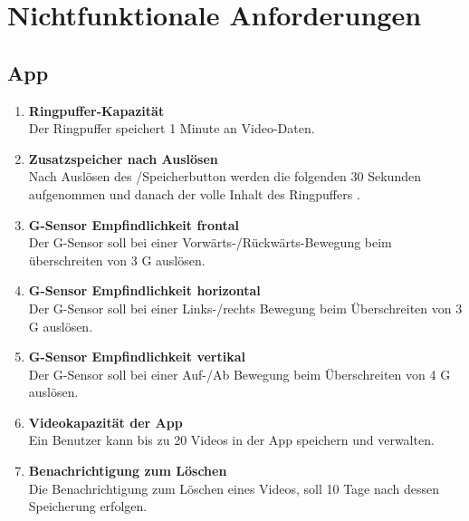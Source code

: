 \chapter{Nichtfunktionale Anforderungen}

\section{\gls{App}}
\begin{enumerate}
\renewcommand{\labelenumi}{\textbf{\theenumi}}
\renewcommand{\theenumi}{NA\arabic{enumi}0}
\setcounter{enumi}{99}
\item \textbf{\gls{Ringpuffer}-Kapazität} \hfill\\ Der \gls{Ringpuffer} speichert 1 Minute an Video-Daten.

\item \textbf{Zusatzspeicher nach Auslösen} \hfill\\ Nach Auslösen des /Speicherbutton werden die folgenden 30 Sekunden aufgenommen und danach der volle Inhalt des Ringpuffers .

\item \label{na:GSensfront}\textbf{\gls{G-Sensor} Empfindlichkeit frontal} \hfill\\  Der \gls{G-Sensor} soll bei einer Vorwärts-/Rückwärts-Bewegung beim überschreiten von 3 G auslösen.

\item \textbf{\gls{G-Sensor} Empfindlichkeit horizontal} \hfill\\  Der \gls{G-Sensor} soll bei einer Links-/rechts Bewegung beim Überschreiten von 3 G auslösen.

\item \label{na:GSensvert}\textbf{\gls{G-Sensor} Empfindlichkeit vertikal} \hfill\\  Der \gls{G-Sensor} soll bei einer Auf-/Ab Bewegung beim Überschreiten von 4 G auslösen.

\item \textbf{Videokapazität der \gls{App}} \hfill\\  Ein Benutzer kann bis zu 20 Videos in der \gls{App} speichern und verwalten.

\item \textbf{Benachrichtigung zum Löschen} \hfill\\  Die Benachrichtigung zum Löschen eines Videos, soll 10 Tage nach dessen Speicherung erfolgen.
\end{enumerate}

